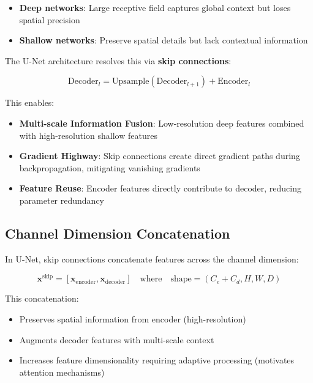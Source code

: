 \documentclass{ecsproject}     %
\begin{document}
\begin{itemize}
    \item \textbf{Deep networks}: Large receptive field captures global context but loses spatial precision
    \item \textbf{Shallow networks}: Preserve spatial details but lack contextual information
\end{itemize}

The U-Net architecture resolves this via \textbf{skip connections}:

\begin{equation}
\text{Decoder}_{l} = \text{Upsample}(\text{Decoder}_{l+1}) + \text{Encoder}_{l}
\label{Eq:SkipConnection}
\end{equation}

This enables:
\begin{itemize}
    \item \textbf{Multi-scale Information Fusion}: Low-resolution deep features combined with high-resolution shallow features
    \item \textbf{Gradient Highway}: Skip connections create direct gradient paths during backpropagation, mitigating vanishing gradients
    \item \textbf{Feature Reuse}: Encoder features directly contribute to decoder, reducing parameter redundancy
\end{itemize}

\subsection{Channel Dimension Concatenation}

In U-Net, skip connections concatenate features across the channel dimension:

\begin{equation}
\mathbf{x}^{\text{skip}} = [\mathbf{x}_{\text{encoder}}, \mathbf{x}_{\text{decoder}}] \quad \text{where} \quad \text{shape} = (C_e + C_d, H, W, D)
\label{Eq:Concatenation}
\end{equation}

This concatenation:
\begin{itemize}
    \item Preserves spatial information from encoder (high-resolution)
    \item Augments decoder features with multi-scale context
    \item Increases feature dimensionality requiring adaptive processing (motivates attention mechanisms)
\end{itemize}
\end{document}
